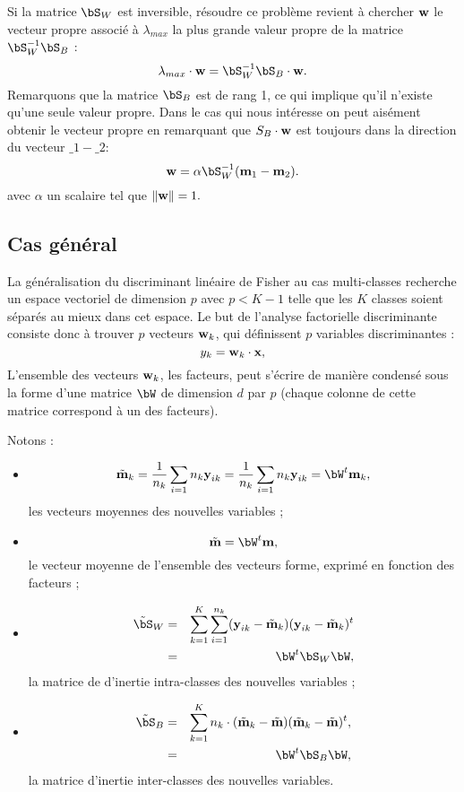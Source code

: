 Si la matrice $\bS_W$ est inversible, r\'esoudre 
ce probl\`eme revient \`a chercher $\mbox{\bf w}$ le vecteur propre
associ\'e \`a $\lambda_{max}$ la plus grande valeur propre de la matrice 
$\bS_W^{-1}\bS_B$ :
$$
 \lambda_{max} \cdot \bw = \bS_W^{-1}\bS_B \cdot \bw .
$$
Remarquons que la matrice $\bS_B$ est de rang 1, ce qui implique
qu'il n'existe qu'une seule valeur propre. Dans le cas qui nous
int\'eresse on peut ais\'ement obtenir le vecteur propre en remarquant
que $S_B\cdot \mbox{\bf w}$ est toujours dans la direction du vecteur $\bm_1-\bm_2$:
$$
\bw= \alpha  \bS_W^{-1} (\bm_1-\bm_2).
$$
avec $\alpha$ un scalaire tel que $\|\mbox{\bf w}\|=1.$



\subsection{Cas g\'en\'eral}


La g\'en\'eralisation du discriminant lin\'eaire de Fisher au cas multi-classes
recherche un espace vectoriel de dimension $p$ avec  $p<K-1$ telle que les
$K$ classes soient s\'epar\'es au mieux dans cet espace.
Le but de l'analyse factorielle discriminante consiste donc \`a trouver $p$
vecteurs $\mbox{\bf w}_k$, qui d\'efinissent $p$ variables 
discriminantes :
$$
y_k= \mbox{\bf w}_k \cdot \mbox{\bf x},
$$
L'ensemble des vecteurs $\mbox{\bf w}_k$, les facteurs, peut s'\'ecrire de mani\`ere
condens\'e sous la forme d'une matrice   $\bW$ de dimension $d$ par $p$ 
(chaque colonne de cette matrice  correspond \`a un des facteurs). 


Notons :
\begin{itemize}
\item 
$$
\tilde{\bm}_k = \frac{1}{n_k} \sum_{i=1}{n_k} \y_{ik}
              = \frac{1}{n_k} \sum_{i=1}{n_k} \y_{ik}=\bW^t \bm_k,
$$
les vecteurs moyennes des nouvelles variables ;
\item
$$
\tilde{\bm}  =\bW^t \bm,
$$
le vecteur moyenne de l'ensemble des vecteurs forme, exprim\'e en fonction des facteurs ;
\item
\begin{eqnarray*}
\tilde{\bS}_W &=& \sum_{k=1}^K \sum_{i=1}^{n_k} (\y_{ik}-\tilde{\bm}_k)(\y_{ik}-\tilde{\bm}_k)^t\\
             & =& \bW^t \bS_W \bW,
\end{eqnarray*}
la matrice de d'inertie intra-classes des nouvelles variables ;
\item
\begin{eqnarray*}
\tilde{\bS}_B & = & \sum_{k=1}^K n_k \cdot (\tilde{\bm}_k - \tilde{\bm})(\tilde{\bm}_k - \tilde{\bm})^t ,\\
      &= &   \bW^t \bS_B \bW,
\end{eqnarray*}
la matrice d'inertie inter-classes des nouvelles variables.
\end{itemize}


